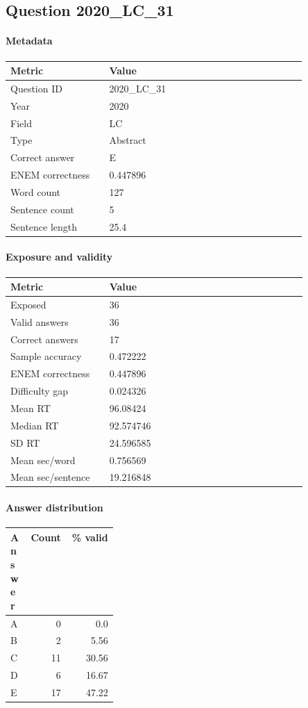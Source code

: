 \subsection*{Question 2020\_LC\_31}
\label{sec:q_2020_LC_31}
\paragraph{Metadata}
\begin{tabular}{p{0.30\linewidth}p{0.60\linewidth}}
\toprule
Metric & Value\\
\midrule
Question ID & 2020\_LC\_31\\
Year & 2020\\
Field & LC\\
Type & Abstract\\
Correct answer & E\\
ENEM correctness & 0.447896\\
Word count & 127\\
Sentence count & 5\\
Sentence length & 25.4\\
\bottomrule
\end{tabular}

\paragraph{Exposure and validity}
\begin{tabular}{p{0.30\linewidth}p{0.60\linewidth}}
\toprule
Metric & Value\\
\midrule
Exposed & 36\\
Valid answers & 36\\
Correct answers & 17\\
Sample accuracy & 0.472222\\
ENEM correctness & 0.447896\\
Difficulty gap & 0.024326\\
Mean RT & 96.08424\\
Median RT & 92.574746\\
SD RT & 24.596585\\
Mean sec/word & 0.756569\\
Mean sec/sentence & 19.216848\\
\bottomrule
\end{tabular}

\paragraph{Answer distribution}
\begin{tabular}{p{0.18\linewidth}rr}
\toprule
Answer & Count & \% valid\\
\midrule
A & 0 & 0.0\\
B & 2 & 5.56\\
C & 11 & 30.56\\
D & 6 & 16.67\\
E & 17 & 47.22\\
\bottomrule
\end{tabular}

